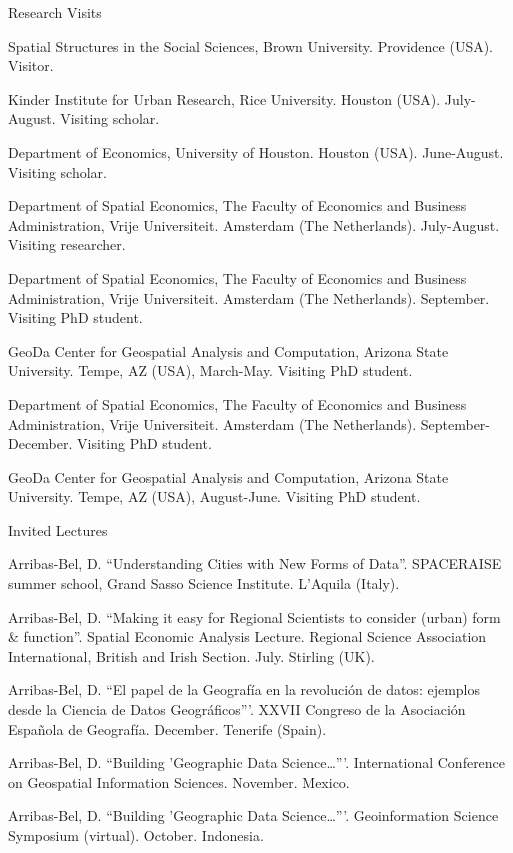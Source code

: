 \documentclass[12pt,2up]{article}
\begin{document}
\begin{cv}{}
\begin{cvlist}{Research Visits}
 \item[] Spatial Structures in the Social Sciences, Brown University.
     Providence (USA). Visitor.

\item[2015] Kinder Institute for Urban Research, Rice University. Houston (USA).
     July-August. Visiting scholar.

\item[2014] Department of Economics, University of Houston. Houston (USA).
     June-August. Visiting scholar.

\item[2011] Department of Spatial Economics, The Faculty of Economics and
     Business Administration, Vrije Universiteit. Amsterdam (The Netherlands).
     July-August. Visiting researcher.

 \item[2010] Department of Spatial Economics, The Faculty of Economics and
     Business Administration, Vrije Universiteit. Amsterdam (The Netherlands).
     September. Visiting PhD student.
 
\item[] GeoDa Center for Geospatial Analysis and Computation, Arizona
    State University. Tempe, AZ (USA), March-May. Visiting PhD student.
 
 \item[2009] Department of Spatial Economics, The Faculty of Economics and
     Business Administration, Vrije Universiteit. Amsterdam (The Netherlands).
     September-December. Visiting PhD student.

\item[2008-09] GeoDa Center for Geospatial Analysis and Computation, Arizona
    State University. Tempe, AZ (USA), August-June. Visiting PhD student.
  \end{cvlist}

 \begin{cvlist}{Invited Lectures}
\item[\textbf{Keynote speeches}]

\item[2026] Arribas-Bel, D. ``Understanding Cities with New Forms of Data''.
        SPACERAISE summer school, Grand Sasso Science Institute. L'Aquila
        (Italy).
\item[2022] Arribas-Bel, D. ``Making it easy for Regional Scientists to
        consider (urban) form \& function''.
    Spatial Economic Analysis Lecture. Regional Science Association
    International, British and Irish Section. July. Stirling (UK).
\item[2021] Arribas-Bel, D. ``El papel de la Geograf\'ia en la revoluci\'on de datos:
    ejemplos desde la Ciencia de Datos Geogr\'aficos'''. XXVII Congreso de la
    Asociaci\'on Espa\~nola de Geograf\'ia. December. Tenerife (Spain).
\item[] Arribas-Bel, D. ``Building 'Geographic Data Science\ldots'''.
    International Conference on Geospatial Information Sciences. November.
    Mexico.
\item[] Arribas-Bel, D. ``Building 'Geographic Data Science\ldots'''.
        Geoinformation Science Symposium (virtual). October. Indonesia.


\end{cvlist}
\end{cv}
\end{document}

